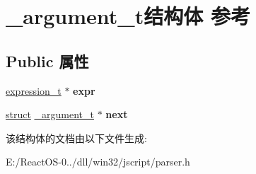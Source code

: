 \hypertarget{struct__argument__t}{}\section{\+\_\+argument\+\_\+t结构体 参考}
\label{struct__argument__t}
\subsection*{Public 属性}
\begin{DoxyCompactItemize}
\item 
\mbox{\label{struct__argument__t_a7cfece966d2f5504a31dc95c164d2347}} 
\hyperlink{struct__expression__t}{expression\+\_\+t} $\ast$ {\bfseries expr}
\item 
\mbox{\label{struct__argument__t_aef5f1d58572bdbde65708ff9cf1b6bcd}} 
\hyperlink{interfacestruct}{struct} \hyperlink{struct__argument__t}{\+\_\+argument\+\_\+t} $\ast$ {\bfseries next}
\end{DoxyCompactItemize}


该结构体的文档由以下文件生成\+:\begin{DoxyCompactItemize}
\item 
E\+:/\+React\+O\+S-\/0../dll/win32/jscript/parser.\+h\end{DoxyCompactItemize}
